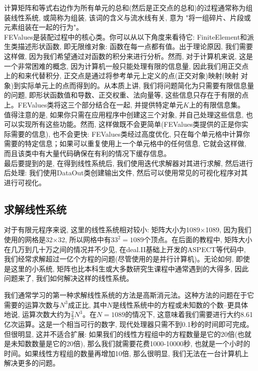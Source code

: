 \documentclass[12pt, a4paper, oneside]{ctexart}
\begin{document}
计算矩阵和等式右边作为所有单元的总和(然后是正交点的总和)的过程通常称为组装线性系统, 或简称为组装, 该词的含义与流水线有关, 意为 "将一组碎片、片段或元素组装在一起的行为"。\\
FEValues是装配过程中的核心类。你可以从以下角度来看待它:  FiniteElement和派生类描述形状函数, 即无限维对象: 函数在每一点都有值。出于理论原因, 我们需要这样做, 因为我们希望通过对函数的积分来进行分析。然而, 对于计算机来说, 这是一个非常困难的概念, 因为计算机一般只能处理有限的信息量,  因此我们用正交点上的和来代替积分, 正交点是通过将参考单元上定义的点(正交对象)映射(映射 对象)到实际单元上的点而得到的。从本质上讲, 我们将问题简化为只需要有限信息量的问题, 即形状函数值和导数、正交权重、法向量等, 这些信息只存在于有限的点上。FEValues类将这三个部分结合在一起, 并提供特定单元$K$上的有限信息集。\\
值得注意的是, 如果你只需在应用程序中创建这三个对象, 并自己处理这些信息, 也可以实现所有这些功能。然而, 这样做既不会更简单(FEValues类提供的正是你实际需要的信息), 也不会更快: FEValues类经过高度优化, 只在每个单元格中计算你需要的特定信息；如果可以重复使用上一个单元格中的任何信息, 它就会这样做, 而且该类中有大量代码确保在有利的情况下缓存信息。\\
最后要提到的是, 在得到线性系统后, 我们使用迭代求解器对其进行求解, 然后进行后处理: 我们使用DataOut类创建输出文件, 然后可以使用常见的可视化程序对其进行可视化。

\subsection{求解线性系统}
对于有限元程序来说, 这里的线性系统相对较小: 矩阵大小为1089×1089, 因为我们使用的网格是32×32, 所以网格中有$33^2=1089$个顶点。在后面的教程中, 矩阵大小在几万到几十万之间的情况并不少见, 在deal.II基础上开发的ASPECT等代码中, 我们经常求解超过一亿个方程的问题(尽管使用的是并行计算机)。无论如何, 即使是这里的小系统, 矩阵也比本科生或大多数研究生课程中通常遇到的大得多, 因此问题来了, 我们如何解决这样的线性系统。

我们通常学习的第一种求解线性系统的方法是高斯消元法。这种方法的问题在于它需要的运算次数与$N^3$成正比, 其中$N$是线性系统中的方程或未知数的个数--更具体地说, 运算次数大约为$\frac{2}{3}N^3$。在$N=1089$的情况下, 这意味着我们需要进行大约8.61亿次运算。这是一个相当可行的数字, 现代处理器只需不到0.1秒的时间即可完成。但很明显, 这并不适合扩展:  如果我们的线性方程组中的方程数量是它的20倍(也就是未知数数量是它的20倍), 那么我们就需要花费1000-10000秒, 也就是一个小时的时间。如果线性方程组的数量再增加10倍, 那么很明显, 我们无法在一台计算机上解决更多的问题。
\end{document}
